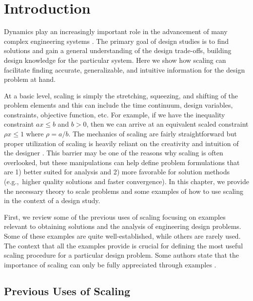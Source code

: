 \section{Introduction\label{sec:ch4:introduction}}

Dynamics play an increasingly important role in the advancement of many complex engineering systems \cite{Allison2014a}.
The primary goal of design studies is to find solutions and gain a general understanding of the design trade-offs, building design knowledge for the particular system.
Here we show how scaling can facilitate finding accurate, generalizable, and intuitive information for the design problem at hand.

At a basic level, scaling is simply the stretching, squeezing, and shifting of the problem elements and this can include the time continuum, design variables, constraints, objective function, etc.
For example, if we have the inequality constraint $a x \leq b$ and $b > 0$, then we can arrive at an equivalent scaled constraint $\rho x \leq 1$ where $\rho=a/b$.
The mechanics of scaling are fairly straightforward but proper utilization of scaling is heavily reliant on the creativity and intuition of the designer \cite{Holmes2009a}. 
This barrier may be one of the reasons why scaling is often overlooked, but these manipulations can help define problem formulations that are 1) better suited for analysis and 2) more favorable for solution methods (e.g.,~higher quality solutions and faster convergence). 
In this chapter, we provide the necessary theory to scale  problems and some examples of how to use scaling in the context of a design study.

First, we review some of the previous uses of scaling focusing on examples relevant to obtaining solutions and the analysis of engineering design problems.
Some of these examples are quite well-established, while others are rarely used. 
The context that all the examples provide is crucial for defining the most useful scaling procedure for a particular design problem.
Some authors state that the importance of scaling can only be fully appreciated through examples \cite{Groesen2007a}.

\subsection{Previous Uses of Scaling \label{sec:ch4:uses}}

